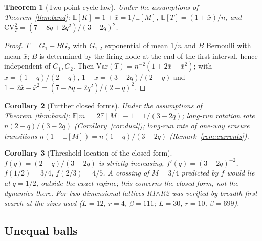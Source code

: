 \documentclass[aps,pre,onecolumn,superscriptaddress,amsmath,amssymb,longbibliography]{revtex4-2}
\newtheorem{theorem}{Theorem}[section]
\newtheorem{corollary}[theorem]{Corollary}
\theoremstyle{definition}
\theoremstyle{remark}
\newcommand{\E}{\mathbb{E}}
\begin{document}
\begin{theorem}[Two-point cycle law]
\label{thm:cycle}
Under the assumptions of Theorem~\ref{thm:band}: $\E[K]=1+\bar x=1/\E[M]$,
$\E[T]=(1+\bar x)/n$, and
$\mathrm{CV}_T^2=(7-8q+2q^2)/(3-2q)^2$.
\end{theorem}
\begin{proof}
$T=G_1+BG_2$ with $G_{1,2}$ exponential of mean $1/n$ and $B$ Bernoulli
with mean $\bar x$; $B$ is determined by the firing node at the end of
the first interval, hence independent of $G_1,G_2$. Then
$\mathrm{Var}(T)=n^{-2}(1+2\bar x-\bar x^2)$; with
$\bar x=(1-q)/(2-q)$, $1+\bar x=(3-2q)/(2-q)$ and
$1+2\bar x-\bar x^2=(7-8q+2q^2)/(2-q)^2$.
\end{proof}

\begin{corollary}[Further closed forms]
\label{cor:obs}
Under the assumptions of Theorem~\ref{thm:band}:
$\E|m|=2\E[M]-1=1/(3-2q)$; long-run rotation rate
$n(2-q)/(3-2q)$ (Corollary~\ref{cor:dual}); long-run rate of one-way
erasure transitions $n(1-\E[M])=n(1-q)/(3-2q)$
(Remark~\ref{rem:currents}).
\end{corollary}

\begin{corollary}[Threshold location of the closed form]
\label{cor:thr}
$f(q)=(2-q)/(3-2q)$ is strictly increasing, $f'(q)=(3-2q)^{-2}$,
$f(1/2)=3/4$, $f(2/3)=4/5$. A crossing of $M=3/4$ predicted by $f$ would
lie at $q=1/2$, outside the exact regime; this concerns the closed form,
not the dynamics there. For two-dimensional lattices R1$\wedge$R2 was
verified by breadth-first search at the sizes used ($L=12$, $r=4$,
$\beta=111$; $L=30$, $r=10$, $\beta=699$).
\end{corollary}

\subsection{Unequal balls}
\end{document}
